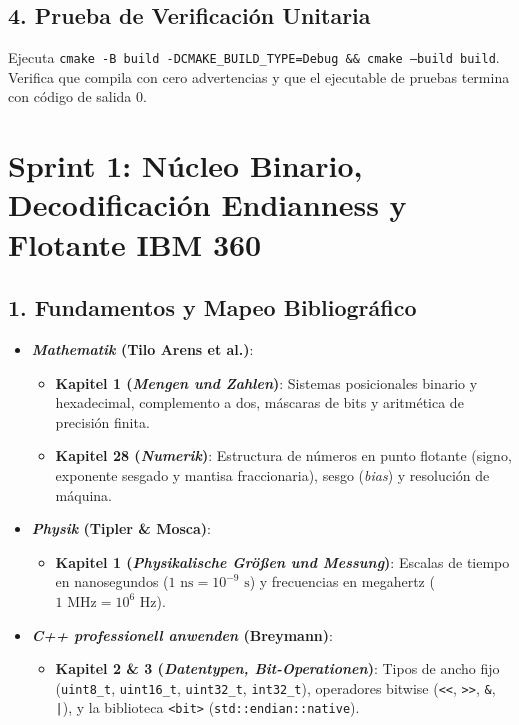 \documentclass[11pt,a4paper]{article}
\begin{document}
\subsection{4. Prueba de Verificación Unitaria}
Ejecuta \texttt{cmake -B build -DCMAKE\_BUILD\_TYPE=Debug \&\& cmake --build build}. Verifica que compila con cero advertencias y que el ejecutable de pruebas termina con código de salida 0.

\section{Sprint 1: Núcleo Binario, Decodificación Endianness y Flotante IBM 360}

\subsection{1. Fundamentos y Mapeo Bibliográfico}
\begin{itemize}
    \item \textbf{\textit{Mathematik} (Tilo Arens et al.)}:
    \begin{itemize}
        \item \textbf{Kapitel 1 (\textit{Mengen und Zahlen})}: Sistemas posicionales binario y hexadecimal, complemento a dos, máscaras de bits y aritmética de precisión finita.
        \item \textbf{Kapitel 28 (\textit{Numerik})}: Estructura de números en punto flotante (signo, exponente sesgado y mantisa fraccionaria), sesgo (\textit{bias}) y resolución de máquina.
    \end{itemize}
    \item \textbf{\textit{Physik} (Tipler \& Mosca)}:
    \begin{itemize}
        \item \textbf{Kapitel 1 (\textit{Physikalische Größen und Messung})}: Escalas de tiempo en nanosegundos ($1\text{ ns} = 10^{-9}\text{ s}$) y frecuencias en megahertz ($1\text{ MHz} = 10^6\text{ Hz}$).
    \end{itemize}
    \item \textbf{\textit{C++ professionell anwenden} (Breymann)}:
    \begin{itemize}
        \item \textbf{Kapitel 2 \& 3 (\textit{Datentypen, Bit-Operationen})}: Tipos de ancho fijo (\texttt{uint8\_t}, \texttt{uint16\_t}, \texttt{uint32\_t}, \texttt{int32\_t}), operadores bitwise (\texttt{<<}, \texttt{>>}, \texttt{\&}, \texttt{|}), y la biblioteca \texttt{<bit>} (\texttt{std::endian::native}).
    \end{itemize}
\end{itemize}
\end{document}
